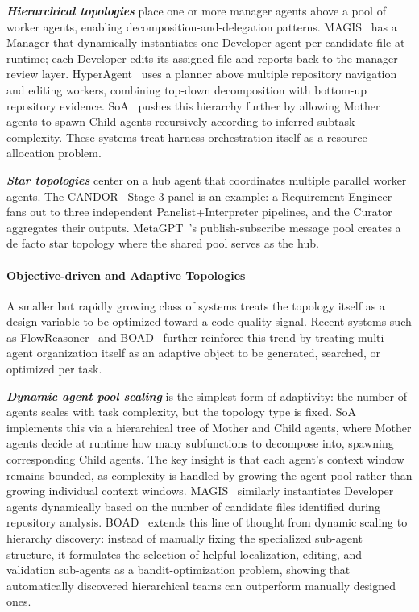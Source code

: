 \textbf{\textit{Hierarchical topologies}} place one or more
manager agents above a pool of worker agents, enabling
decomposition-and-delegation patterns. MAGIS~\cite{Tao2024Magis}
has a Manager that dynamically instantiates one Developer agent
per candidate file at runtime; each Developer edits its assigned
file and reports back to the manager-review layer. HyperAgent~\cite{Phan2024HyperAgent}
uses a planner above multiple repository navigation and editing
workers, combining top-down decomposition with bottom-up
repository evidence. SoA~\cite{Ishibashi2024SelfOrganized}
pushes this hierarchy further by allowing Mother agents to spawn
Child agents recursively according to inferred subtask
complexity. These systems treat harness orchestration itself as a
resource-allocation problem.

\textbf{\textit{Star topologies}} center on a hub agent that
coordinates multiple parallel worker agents. The
CANDOR~\cite{Xu2025Hallucination} Stage 3 panel is an example: a
Requirement Engineer fans out to three independent
Panelist+Interpreter pipelines, and the Curator aggregates their
outputs. MetaGPT~\cite{Hong2023MetaGPT}'s publish-subscribe
message pool creates a de facto star topology where the shared
pool serves as the hub.

\paragraph{Objective-driven and Adaptive Topologies}
A smaller but rapidly growing class of systems treats the
topology itself as a design variable to be optimized toward a
code quality signal. Recent systems such as
FlowReasoner~\cite{gao2025flowreasoner} and
BOAD~\cite{xu2025boad} further reinforce this trend by treating
multi-agent organization itself as an adaptive object to be
generated, searched, or optimized per task.

\textbf{\textit{Dynamic agent pool scaling}} is the simplest form
of adaptivity: the number of agents scales with task complexity,
but the topology type is fixed.
SoA~\cite{Ishibashi2024SelfOrganized} implements this via a
hierarchical tree of Mother and Child agents, where Mother agents
decide at runtime how many subfunctions to decompose into,
spawning corresponding Child agents. The key insight is that each
agent's context window remains bounded, as complexity is handled
by growing the agent pool rather than growing individual context
windows. MAGIS~\cite{Tao2024Magis} similarly instantiates
Developer agents dynamically based on the number of candidate
files identified during repository analysis. BOAD~\cite{xu2025boad} extends this line of thought from dynamic
scaling to hierarchy discovery: instead of manually fixing the
specialized sub-agent structure, it formulates the selection of
helpful localization, editing, and validation sub-agents as a
bandit-optimization problem, showing that automatically
discovered hierarchical teams can outperform manually designed ones.

